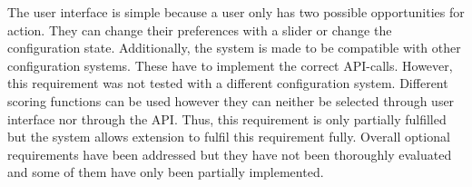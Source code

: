 The user interface is simple because a user only has two possible opportunities for action. They can change their preferences with a slider or change the configuration state. Additionally, the system is made to be compatible with other configuration systems. These have to implement the correct API-calls. However, this requirement was not tested with a different configuration system. Different scoring functions can be used however they can neither be selected through user interface nor through the API. Thus, this requirement is only partially fulfilled but the system allows extension to fulfil this requirement fully.
Overall optional requirements have been addressed but they have not been thoroughly evaluated and some of them have only been partially implemented.